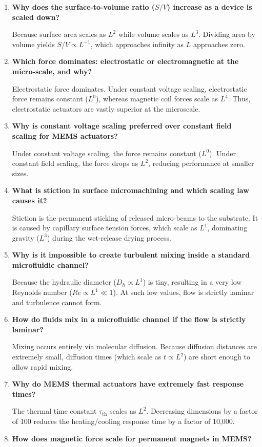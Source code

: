 \documentclass[12pt,a4paper]{article}
\newcommand{\Q}[1]{\textbf{#1}\par\noindent\ignorespaces}
\begin{document}
\begin{tcolorbox}[exambox, title={\textbf{Frequently Asked / Viva Questions}}]
\begin{enumerate}[topsep=0pt, label=\textbf{Q\arabic*.}, itemsep=5pt]
  \item \Q{Why does the surface-to-volume ratio ($S/V$) increase as a device is scaled down?}
    Because surface area scales as $L^2$ while volume scales as $L^3$. Dividing area by volume yields $S/V \propto L^{-1}$, which approaches infinity as $L$ approaches zero.
  \item \Q{Which force dominates: electrostatic or electromagnetic at the micro-scale, and why?}
    Electrostatic force dominates. Under constant voltage scaling, electrostatic force remains constant ($L^0$), whereas magnetic coil forces scale as $L^4$. Thus, electrostatic actuators are vastly superior at the microscale.
  \item \Q{Why is constant voltage scaling preferred over constant field scaling for MEMS actuators?}
    Under constant voltage scaling, the force remains constant ($L^0$). Under constant field scaling, the force drops as $L^2$, reducing performance at smaller sizes.
  \item \Q{What is stiction in surface micromachining and which scaling law causes it?}
    Stiction is the permanent sticking of released micro-beams to the substrate. It is caused by capillary surface tension forces, which scale as $L^1$, dominating gravity ($L^3$) during the wet-release drying process.
  \item \Q{Why is it impossible to create turbulent mixing inside a standard microfluidic channel?}
    Because the hydraulic diameter ($D_h \propto L^1$) is tiny, resulting in a very low Reynolds number ($Re \propto L^1 \ll 1$). At such low values, flow is strictly laminar and turbulence cannot form.
  \item \Q{How do fluids mix in a microfluidic channel if the flow is strictly laminar?}
    Mixing occurs entirely via molecular diffusion. Because diffusion distances are extremely small, diffusion times (which scale as $t \propto L^2$) are short enough to allow rapid mixing.
  \item \Q{Why do MEMS thermal actuators have extremely fast response times?}
    The thermal time constant $\tau_{\text{th}}$ scales as $L^2$. Decreasing dimensions by a factor of 100 reduces the heating/cooling response time by a factor of 10,000.
  \item \Q{How does magnetic force scale for permanent magnets in MEMS?}

\end{enumerate}
\end{tcolorbox}
\end{document}
